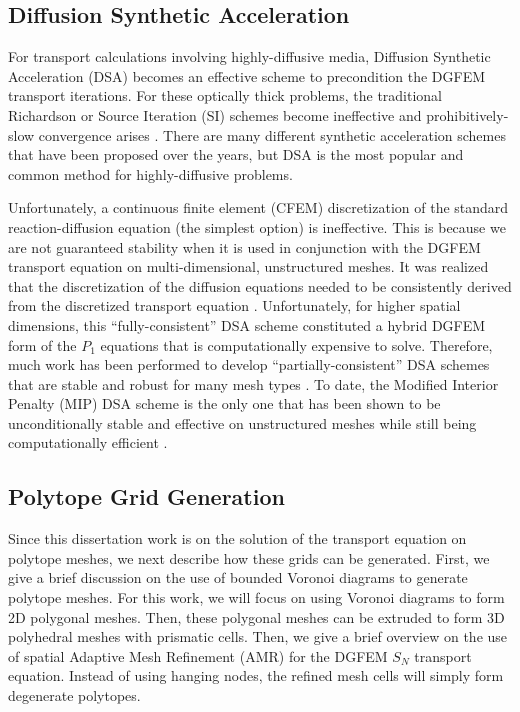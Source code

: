 \subsection{Diffusion Synthetic Acceleration}
\label{sec::Intro_Past_DSA}

For transport calculations involving highly-diffusive media, Diffusion Synthetic Acceleration (DSA) becomes an effective scheme to precondition the DGFEM transport iterations. For these optically thick problems, the traditional Richardson or Source Iteration (SI) schemes become ineffective and prohibitively-slow convergence arises \cite{ref::adams_larsen_iter_methods}. There are many different synthetic acceleration schemes that have been proposed over the years, but DSA is the most popular and common method for highly-diffusive problems.

Unfortunately, a continuous finite element (CFEM) discretization of the standard reaction-diffusion equation (the simplest option) is ineffective. This is because we are not guaranteed stability when it is used in conjunction with the DGFEM transport equation on multi-dimensional, unstructured meshes. It was realized that the discretization of the diffusion equations needed to be consistently derived from the discretized transport equation \cite{alcouffe1976stable,alcouffe1977DSA,larsen1982unconditionally_I,larsen1982unconditionally_II,warsa2002fully}. Unfortunately, for higher spatial dimensions, this ``fully-consistent'' DSA scheme constituted a hybrid DGFEM form of the $P_1$ equations that is computationally expensive to solve. Therefore, much work has been performed to develop ``partially-consistent'' DSA schemes that are stable and robust for many mesh types \cite{ref::dsa_DFEM_adams_martin,wareing1991diffusion,ref::DSA_wang_ragusa}. To date, the Modified Interior Penalty (MIP) DSA scheme is the only one that has been shown to be unconditionally stable and effective on unstructured meshes while still being computationally efficient \cite{ref::DSA_wang_ragusa,turcksin2014discontinuous}.

\subsection{Polytope Grid Generation}
\label{sec::Intro_Past_Polytopes}

Since this dissertation work is on the solution of the transport equation on polytope meshes, we next describe how these grids can be generated. First, we give a brief discussion on the use of bounded Voronoi diagrams to generate polytope meshes. For this work, we will focus on using Voronoi diagrams to form 2D polygonal meshes. Then, these polygonal meshes can be extruded to form 3D polyhedral meshes with prismatic cells. Then, we give a brief overview on the use of spatial Adaptive Mesh Refinement (AMR) for the DGFEM $S_N$ transport equation. Instead of using hanging nodes, the refined mesh cells will simply form degenerate polytopes.

